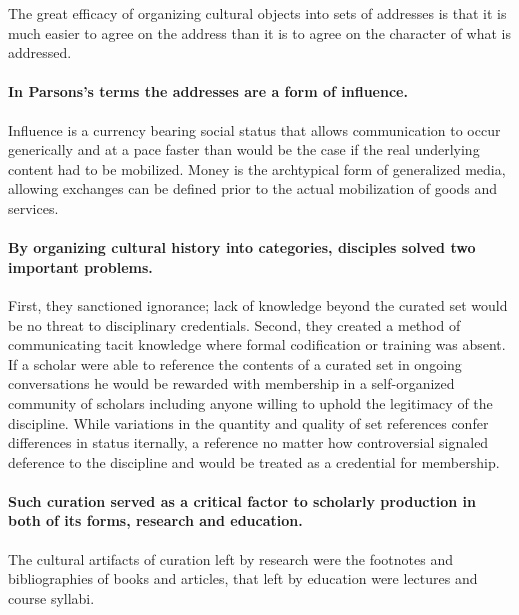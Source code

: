 \documentclass[]{article}
\begin{document}
The great efficacy of organizing cultural objects into sets of addresses
is that it is much easier to agree on the address than it is to agree on
the character of what is addressed.

\paragraph{In Parsons's terms the addresses are a form of
influence.}\label{in-parsonss-terms-the-addresses-are-a-form-of-influence.}

Influence is a currency bearing social status that allows communication
to occur generically and at a pace faster than would be the case if the
real underlying content had to be mobilized. Money is the archtypical
form of generalized media, allowing exchanges can be defined prior to
the actual mobilization of goods and services.

\paragraph{By organizing cultural history into categories, disciples
solved two important
problems.}\label{by-organizing-cultural-history-into-categories-disciples-solved-two-important-problems.}

First, they sanctioned ignorance; lack of knowledge beyond the curated
set would be no threat to disciplinary credentials. Second, they created
a method of communicating tacit knowledge where formal codification or
training was absent. If a scholar were able to reference the contents of
a curated set in ongoing conversations he would be rewarded with
membership in a self-organized community of scholars including anyone
willing to uphold the legitimacy of the discipline. While variations in
the quantity and quality of set references confer differences in status
iternally, a reference no matter how controversial signaled deference to
the discipline and would be treated as a credential for membership.

\paragraph{Such curation served as a critical factor to scholarly
production in both of its forms, research and
education.}\label{such-curation-served-as-a-critical-factor-to-scholarly-production-in-both-of-its-forms-research-and-education.}

The cultural artifacts of curation left by research were the footnotes
and bibliographies of books and articles, that left by education were
lectures and course syllabi.
\end{document}

